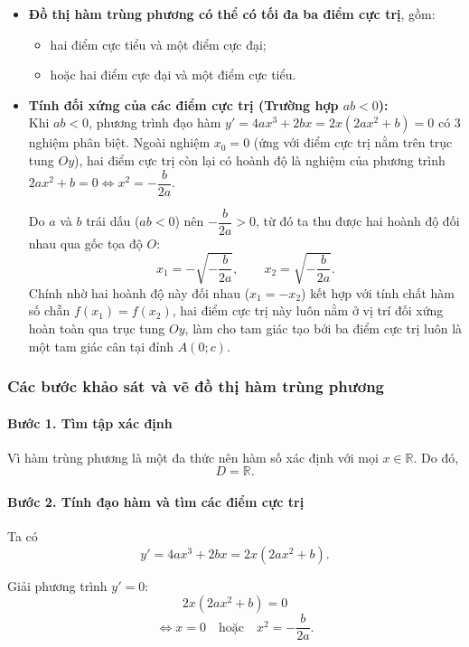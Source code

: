 \begin{itemize}
\begin{itemize}
    \item \textbf{ Đồ thị hàm trùng phương có thể có tối đa ba điểm cực trị}, gồm:
    \begin{itemize}
        \item hai điểm cực tiểu và một điểm cực đại;
        \item hoặc hai điểm cực đại và một điểm cực tiểu.
    \end{itemize}

    \item \textbf{Tính đối xứng của các điểm cực trị (Trường hợp $ab < 0$):} \\
    Khi $ab < 0$, phương trình đạo hàm $y' = 4ax^3 + 2bx = 2x(2ax^2 + b) = 0$ có 3 nghiệm phân biệt. 
    Ngoài nghiệm $x_0 = 0$ (ứng với điểm cực trị nằm trên trục tung $Oy$), hai điểm cực trị còn lại có hoành độ là nghiệm của phương trình $2ax^2 + b = 0 \iff x^2 = -\dfrac{b}{2a}$. 
    
    Do $a$ và $b$ trái dấu ($ab < 0$) nên $-\dfrac{b}{2a} > 0$, từ đó ta thu được hai hoành độ đối nhau qua gốc tọa độ $O$:
    \[
    x_1 = -\sqrt{-\frac{b}{2a}},
    \qquad
    x_2 = \sqrt{-\frac{b}{2a}}.
    \]
    Chính nhờ hai hoành độ này đối nhau ($x_1 = -x_2$) kết hợp với tính chất hàm số chẵn $f(x_1) = f(x_2)$, hai điểm cực trị này luôn nằm ở vị trí đối xứng hoàn toàn qua trục tung $Oy$, làm cho tam giác tạo bởi ba điểm cực trị luôn là một tam giác cân tại đỉnh $A(0; c)$.
\end{itemize}


\subsubsection{Các bước khảo sát và vẽ đồ thị hàm trùng phương}

\paragraph{Bước 1. Tìm tập xác định}

Vì hàm trùng phương là một đa thức nên hàm số xác định với mọi
$x\in\mathbb{R}$. Do đó,
\[
D=\mathbb{R}.
\]

\paragraph{Bước 2. Tính đạo hàm và tìm các điểm cực trị}

Ta có
\[
y'=4ax^3+2bx
=2x(2ax^2+b).
\]

Giải phương trình $y'=0$:
\[
2x(2ax^2+b)=0
\]
\[
\Leftrightarrow
x=0
\quad\text{hoặc}\quad
x^2=-\frac{b}{2a}.
\]


\end{itemize}
